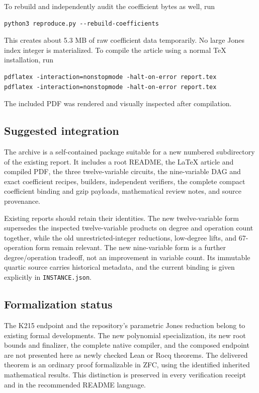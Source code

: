 To rebuild and independently audit the coefficient bytes as well, run
\begin{verbatim}
python3 reproduce.py --rebuild-coefficients
\end{verbatim}
This creates about 5.3 MB of raw coefficient data temporarily. No large
Jones index integer is materialized. To compile the article using a normal
TeX installation, run
\begin{verbatim}
pdflatex -interaction=nonstopmode -halt-on-error report.tex
pdflatex -interaction=nonstopmode -halt-on-error report.tex
\end{verbatim}
The included PDF was rendered and visually inspected after compilation.

\subsection{Suggested integration}
The archive is a self-contained package suitable for a new numbered
subdirectory of the existing report. It includes a root README, the LaTeX
article and compiled PDF, the three twelve-variable circuits, the
nine-variable DAG and exact coefficient recipes, builders, independent
verifiers, the complete compact coefficient binding and gzip payloads,
mathematical review notes, and source provenance.

Existing reports should retain their identities. The new twelve-variable
form supersedes the inspected twelve-variable products on degree and
operation count together, while the old unrestricted-integer reductions,
low-degree lifts, and 67-operation form remain relevant. The new nine-variable
form is a further degree/operation tradeoff, not an improvement in variable
count. Its immutable quartic source carries historical metadata, and the
current binding is given explicitly in \texttt{INSTANCE.json}.

\subsection{Formalization status}
The K215 endpoint and the repository's parametric Jones reduction belong to
existing formal developments. The new polynomial specialization, its new
root bounds and finalizer, the complete native compiler, and the composed
endpoint are not presented here as newly checked Lean or Rocq theorems.
The delivered theorem is an ordinary proof formalizable in ZFC, using the
identified inherited mathematical results. This distinction is preserved in
every verification receipt and in the recommended README language.

